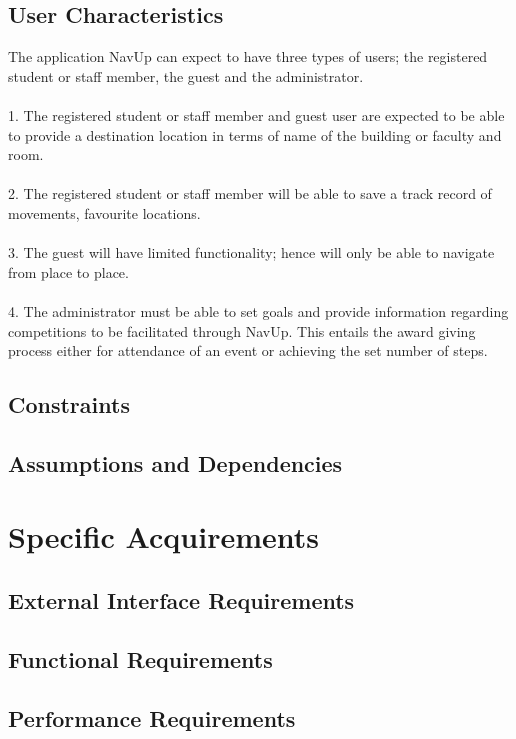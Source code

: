 \documentclass[a4paper,10pt]{article}
\begin{document}
	\subsection{User Characteristics}
		The application NavUp can expect to have three types of users; the registered student or staff member, the guest and the administrator.\\
		\\
			1. The registered student or staff member and guest user are expected to be able to provide a destination location in terms of name of the building or faculty and room.\\
			\\
			2. The registered student or staff member will be able to save a track record of movements, favourite locations.\\
			\\
			3. The guest will have limited functionality; hence will only be able to navigate from place to place.\\
			\\
			4. The administrator must be able to set goals and provide information regarding competitions to be facilitated through NavUp. This entails the award giving process either for attendance of an event or achieving the set number of steps.\\

	\subsection{Constraints}
	\subsection{Assumptions and Dependencies}

\section{Specific Acquirements}

	\subsection{External Interface Requirements}
	\subsection{Functional Requirements}
	\subsection{Performance Requirements}
\end{document}

